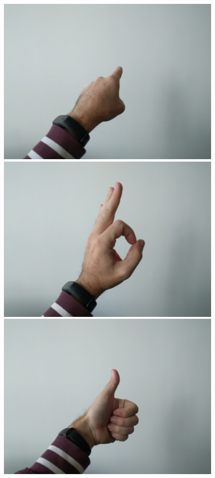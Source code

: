\begin{figure}[htb]
   \centering
   \begin{minipage}[c]{0.3\linewidth}
      \includegraphics[width=0.95\linewidth]{figures/1.jpg}
   \end{minipage} 
   \begin{minipage}[c]{0.3\linewidth}
      \includegraphics[width=0.95\linewidth]{figures/2.jpg}
   \end{minipage}
   \begin{minipage}[c]{0.3\linewidth}
      \includegraphics[width=0.95\linewidth]{figures/3.jpg}

\end{minipage}
\end{figure}
